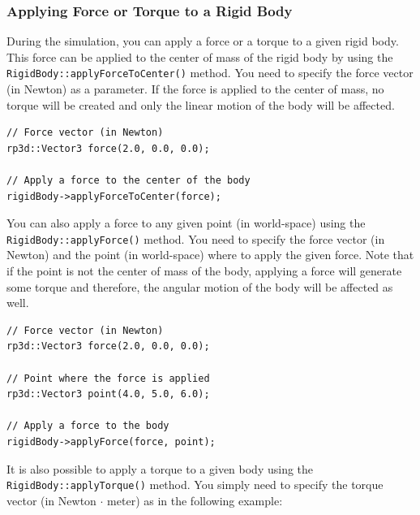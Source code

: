 \documentclass[a4paper,12pt]{article}
\begin{document}
    \subsubsection{Applying Force or Torque to a Rigid Body}

    During the simulation, you can apply a force or a torque to a given rigid body. This force can be applied to the center of mass of the rigid body by using the
    \texttt{RigidBody::applyForceToCenter()} method. You need to specify the force vector (in Newton) as a parameter. If the force is applied to the center of mass, no
    torque will be created and only the linear motion of the body will be affected. \\

    \begin{lstlisting}
// Force vector (in Newton)
rp3d::Vector3 force(2.0, 0.0, 0.0);

// Apply a force to the center of the body
rigidBody->applyForceToCenter(force);
  \end{lstlisting}

    \vspace{0.6cm}

    \begin{sloppypar}
        You can also apply a force to any given point (in world-space) using the \texttt{RigidBody::applyForce()} method. You need to specify the force vector (in Newton) and the point
        (in world-space) where to apply the given force. Note that if the point is not the center of mass of the body, applying a force will generate some torque and therefore, the
        angular motion of the body will be affected as well. \\
    \end{sloppypar}

    \begin{lstlisting}
// Force vector (in Newton)
rp3d::Vector3 force(2.0, 0.0, 0.0);

// Point where the force is applied
rp3d::Vector3 point(4.0, 5.0, 6.0);

// Apply a force to the body
rigidBody->applyForce(force, point);
  \end{lstlisting}

    \vspace{0.6cm}

     \begin{sloppypar}
        It is also possible to apply a torque to a given body using the \texttt{RigidBody::applyTorque()} method. You simply need to specify the torque vector (in Newton $\cdot$ meter) as
        in the following example: \\
     \end{sloppypar}
\end{document}
